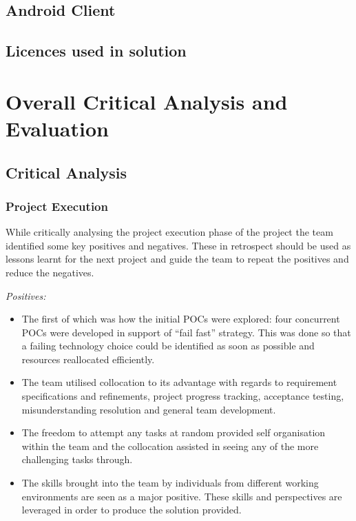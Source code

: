 \documentclass[12pt]{witseiepaper}
\begin{document}
\subsection{Android Client}

\subsection{Licences used in solution}

\section{Overall Critical Analysis and Evaluation}

\subsection{Critical Analysis}


\subsubsection{Project Execution}



While critically analysing the project execution phase of the project the team identified some key positives and negatives. These in retrospect should be used as lessons learnt for the next project and guide the team to repeat the positives and reduce the negatives.

\textit{Positives:}


\begin{itemize}
\item The first of which was how the initial POCs were explored: four concurrent POCs were developed in support of “fail fast” strategy. This was done so that a failing technology choice could be identified as soon as possible and resources reallocated efficiently.
\item The team utilised collocation to its advantage with regards to requirement specifications and refinements, project progress tracking, acceptance testing, misunderstanding resolution and general team development. 
\item The freedom to attempt any tasks at random provided self organisation within the team and the collocation assisted in seeing any of the more challenging tasks through.
\item The skills brought into the team by individuals from different working environments are seen as a major positive. These skills and perspectives are leveraged in order to produce the solution provided.
\end{itemize}
\end{document}
